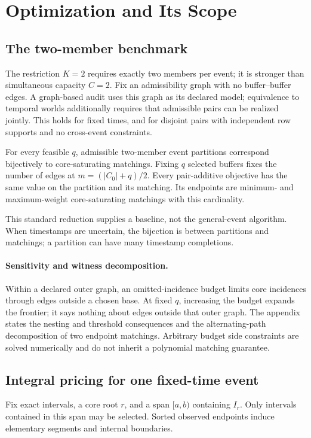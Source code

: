 \section{Optimization and Its Scope}
\label{sec:algorithm}

\subsection{The two-member benchmark}
The restriction $K=2$ requires exactly two members per event; it is stronger
than simultaneous capacity $C=2$. Fix an admissibility graph with no
buffer--buffer edges. A graph-based audit uses this graph as its declared
model; equivalence to temporal worlds additionally requires that admissible
pairs can be realized jointly. This holds for fixed times, and for disjoint
pairs with independent row supports and no cross-event constraints.

\begin{theorem}[$K=2$ core-cover matching equivalence]
\label{thm:k2matching}
For every feasible $q$, admissible two-member event partitions correspond
bijectively to core-saturating matchings. Fixing $q$ selected buffers fixes the number of
edges at $m=(|C_0|+q)/2$. Every pair-additive objective has the same value on
the partition and its matching. Its endpoints are minimum- and maximum-weight
core-saturating matchings with this cardinality.
\end{theorem}

This standard reduction supplies a baseline, not the general-event algorithm.
When timestamps are uncertain, the bijection is between partitions and
matchings; a partition can have many timestamp completions.

\paragraph{Sensitivity and witness decomposition.}
Within a declared outer graph, an omitted-incidence budget limits core
incidences through edges outside a chosen base. At fixed $q$, increasing the
budget expands the frontier; it says nothing about edges outside that outer
graph. The appendix states the nesting and threshold consequences and the
alternating-path decomposition of two endpoint matchings. Arbitrary budget
side constraints are solved numerically and do not inherit a polynomial
matching guarantee.

\subsection{Integral pricing for one fixed-time event}
Fix exact intervals, a core root $r$, and a span $[a,b)$ containing $I_r$.
Only intervals contained in this span may be selected. Sorted observed
endpoints induce elementary segments and internal boundaries.

